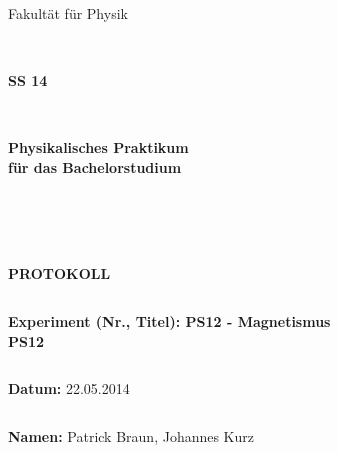 \documentclass[12pt,a4paper]{article}
\begin{document}
\thispagestyle{empty}
			\begin{center}
			\Large{Fakultät für Physik}\\
			\end{center}
\begin{verbatim}


\end{verbatim}
			\begin{center}
			\textbf{\LARGE SS 14}
			\end{center}
\begin{verbatim}


\end{verbatim}
			\begin{center}
			\textbf{\LARGE{Physikalisches Praktikum\\ für das Bachelorstudium}}
			\end{center}
\begin{verbatim}




\end{verbatim}

			\begin{center}
			\textbf{\LARGE{PROTOKOLL}}
			\end{center}
			
\begin{verbatim}

\end{verbatim}

			\begin{flushleft}
			\textbf{\Large{Experiment (Nr., Titel): PS12 - Magnetismus}\\
			\LARGE{PS12}}	
			\end{flushleft}

\begin{verbatim}

\end{verbatim}	
			\begin{flushleft}
			\textbf{\Large{Datum:}} \Large{22.05.2014}
			\end{flushleft}
			
\begin{verbatim}
\end{verbatim}
		\begin{flushleft}
			\textbf{\Large{Namen:}} \Large{Patrick Braun, Johannes Kurz}
			\end{flushleft}
\end{document}
